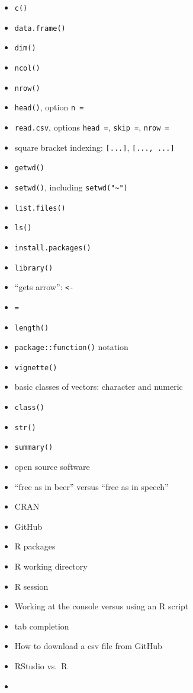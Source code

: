 \documentclass[]{book}
\providecommand{\tightlist}{%
  \setlength{\itemsep}{0pt}\setlength{\parskip}{0pt}}
\theoremstyle{definition}
\theoremstyle{definition}
\theoremstyle{definition}
\theoremstyle{remark}
\begin{document}
\begin{itemize}
\tightlist
\item
  \texttt{c()}
\item
  \texttt{data.frame()}
\item
  \texttt{dim()}
\item
  \texttt{ncol()}
\item
  \texttt{nrow()}
\item
  \texttt{head()}, option \texttt{n\ =}
\item
  \texttt{read.csv}, options \texttt{head\ =}, \texttt{skip\ =},
  \texttt{nrow\ =}
\item
  square bracket indexing: \texttt{{[}...{]}}, \texttt{{[}...,\ ...{]}}
\item
  \texttt{getwd()}
\item
  \texttt{setwd()}, including \texttt{setwd("\textasciitilde{}")}
\item
  \texttt{list.files()}
\item
  \texttt{ls()}
\item
  \texttt{install.packages()}
\item
  \texttt{library()}
\item
  ``gets arrow'': \texttt{\textless{}-}
\item
  \texttt{=}
\item
  \texttt{length()}
\item
  \texttt{package::function()} notation
\item
  \texttt{vignette()}
\item
  basic classes of vectors: character and numeric
\item
  \texttt{class()}
\item
  \texttt{str()}
\item
  \texttt{summary()}
\item
  open source software
\item
  ``free as in beer'' versus ``free as in speech''
\item
  CRAN
\item
  GitHub
\item
  R packages
\item
  R working directory
\item
  R session
\item
  Working at the console versus using an R script
\item
  tab completion
\item
  How to download a csv file from GitHub
\item
  RStudio vs.~R
\item

\end{itemize}
\end{document}
